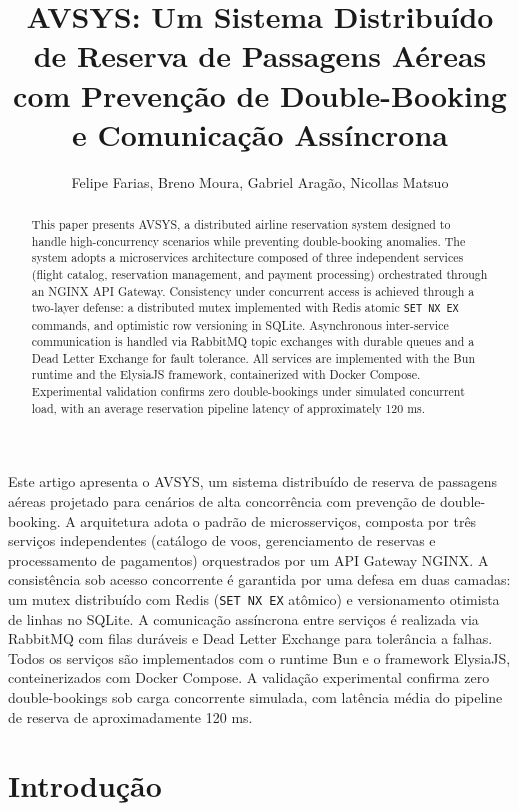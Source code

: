 \documentclass[12pt]{article}
\title{AVSYS: Um Sistema Distribuído de Reserva de Passagens Aéreas\\
  com Prevenção de Double-Booking e Comunicação Assíncrona}
\author{Felipe Farias\inst{1}, Breno Moura\inst{1},
  Gabriel Aragão\inst{1}, Nicollas Matsuo\inst{1}}
\begin{document}
\maketitle

\begin{abstract}
This paper presents AVSYS, a distributed airline reservation system designed to handle
high-concurrency scenarios while preventing double-booking anomalies. The system adopts
a microservices architecture composed of three independent services (flight catalog,
reservation management, and payment processing) orchestrated through an NGINX API
Gateway. Consistency under concurrent access is achieved through a two-layer defense:
a distributed mutex implemented with Redis atomic \texttt{SET NX EX} commands, and
optimistic row versioning in SQLite. Asynchronous inter-service communication is handled
via RabbitMQ topic exchanges with durable queues and a Dead Letter Exchange for fault
tolerance. All services are implemented with the Bun runtime and the ElysiaJS framework,
containerized with Docker Compose. Experimental validation confirms zero double-bookings
under simulated concurrent load, with an average reservation pipeline latency of
approximately 120 ms.
\end{abstract}

\begin{resumo}
Este artigo apresenta o AVSYS, um sistema distribuído de reserva de passagens aéreas
projetado para cenários de alta concorrência com prevenção de double-booking. A
arquitetura adota o padrão de microsserviços, composta por três serviços independentes (catálogo de voos, gerenciamento de reservas
e processamento de pagamentos) orquestrados por um API Gateway NGINX. A consistência sob acesso concorrente é garantida
por uma defesa em duas camadas: um mutex distribuído com Redis (\texttt{SET NX EX}
atômico) e versionamento otimista de linhas no SQLite. A comunicação assíncrona
entre serviços é realizada via RabbitMQ com filas duráveis e Dead Letter Exchange
para tolerância a falhas. Todos os serviços são implementados com o runtime Bun e o
framework ElysiaJS, conteinerizados com Docker Compose. A validação experimental
confirma zero double-bookings sob carga concorrente simulada, com latência média do
pipeline de reserva de aproximadamente 120 ms.
\end{resumo}


\section{Introdução}
\end{document}
